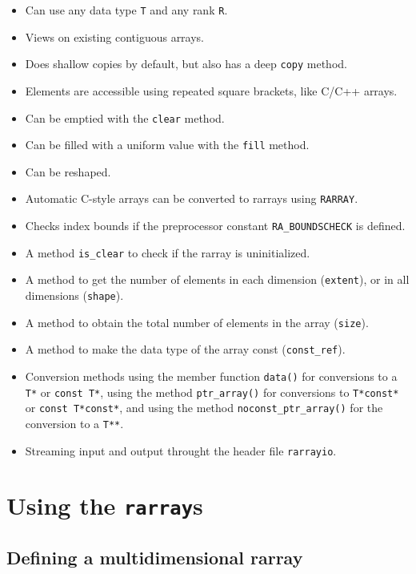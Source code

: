 \documentclass[11pt,twoside]{article}
\begin{document}
\begin{itemize}\itemsep0pt\parskip2pt
\item Can use any data type {\tt T} and any rank {\tt R}.
\item Views on existing contiguous arrays.
\item Does shallow copies by default, but also has a deep {\tt copy} method.
\item Elements are accessible using repeated square brackets, like C/C++ arrays.
\item Can be emptied with the {\tt clear} method.
\item Can be filled with a uniform value with the {\tt fill} method.
\item Can be reshaped.
\item Automatic C-style arrays can be converted to rarrays using {\tt RARRAY}.
\item Checks index bounds if the preprocessor
  constant {\tt RA\_BOUNDSCHECK} is defined. 
\item A method {\tt is\_clear} to check if the rarray is uninitialized.
\item A method to get the number of elements in each
  dimension (\texttt{extent}), or in all dimensions (\texttt{shape}).
\item A method to obtain the total number of elements in the
  array (\texttt{size}).
\item A method to make the data type of the array const
  (\texttt{const\_ref}).
\item Conversion methods using the member
  function \texttt{data()} for conversions to a \texttt{T*} or
  \texttt{const T*}, using the method \texttt{ptr\_array()} for
  conversions to \texttt{T*const*} or \texttt{const T*const*}, and
  using the method \texttt{noconst\_ptr\_array()} for the conversion to a
  \texttt{T**}.
\item Streaming input and output throught the header file \texttt{rarrayio}.
\end{itemize}

\section{Using the {\tt rarray}s}

\subsection{Defining a multidimensional rarray}
\end{document}
